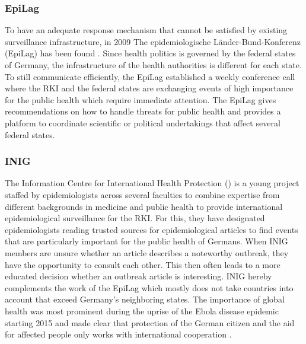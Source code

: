 \subsubsection{EpiLag}
To have an adequate response mechanism that cannot be satisfied by existing surveillance infrastructure, in 2009 The epidemiologische L\"ander-Bund-Konferenz (\gls{EpiLag}) has been found \cite{Mohr2010}. Since health politics is governed by the federal states of Germany, the infrastructure of the health authorities is different for each state. To still communicate efficiently, the EpiLag established a weekly conference call where the RKI and the federal states are exchanging events of high importance for the public health which require immediate attention. The EpiLag gives recommendations on how to handle threats for public health and provides a platform to coordinate scientific or political undertakings that affect several federal states.

\subsubsection{INIG}
The Information Centre for International Health Protection () is a young project staffed by epidemiologists across several faculties to combine expertise from different backgrounds in medicine and public health to provide international epidemiological surveillance for the RKI. For this, they have designated epidemiologists reading trusted sources for epidemiological articles to find events that are particularly important for the public health of Germans. When INIG members are unsure whether an article describes a noteworthy outbreak, they have the opportunity to consult each other. This then often leads to a more educated decision whether an outbreak article is interesting. INIG hereby complements the work of the EpiLag which mostly does not take countries into account that exceed Germany's neighboring states. The importance of global health was most prominent during the uprise of the Ebola disease epidemic starting 2015 and made clear that protection of the German citizen and the aid for affected people only works with international cooperation \cite{Grohe2017}.

